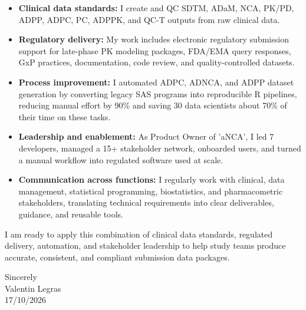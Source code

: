 \documentclass[11pt,a4paper]{article}
\newcommand{\SignDate}{17/10/2026}
\begin{document}
\begin{itemize}
  \item \textbf{Clinical data standards:} I create and QC SDTM, ADaM, NCA,
        PK/PD, ADPP, ADPC, PC, ADPPK, and QC-T outputs from raw clinical data.
  \item \textbf{Regulatory delivery:} My work includes electronic regulatory
        submission support for late-phase PK modeling packages, FDA/EMA query
        responses, GxP practices, documentation, code review, and
        quality-controlled datasets.
  \item \textbf{Process improvement:} I automated ADPC, ADNCA, and ADPP dataset
        generation by converting legacy SAS programs into reproducible R
        pipelines, reducing manual effort by 90\% and saving 30 data scientists
        about 70\% of their time on these tasks.
  \item \textbf{Leadership and enablement:} As Product Owner of 'aNCA', I led 7
        developers, managed a 15+ stakeholder network, onboarded users, and
        turned a manual workflow into regulated software used at scale.
  \item \textbf{Communication across functions:} I regularly work with clinical,
        data management, statistical programming, biostatistics, and
        pharmacometric stakeholders, translating technical requirements into
        clear deliverables, guidance, and reusable tools.
\end{itemize}

I am ready to apply this combination of clinical data standards, regulated
delivery, automation, and stakeholder leadership to help study teams produce
accurate, consistent, and compliant submission data packages.

\vspace{10pt}
Sincerely\\[6pt]
Valentin Legras\\
\SignDate{}
\end{document}
